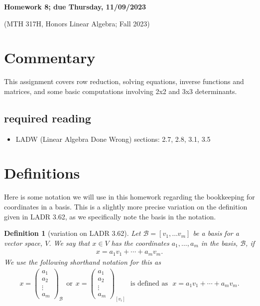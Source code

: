 \documentclass[12pt]{article}
\newtheorem{DEF}[thm]{Definition}
\def\B{\mathcal B}
\newcommand{\ColVecFour}[4]{\begin{pmatrix} #1\\ #2\\#3 \\ #4\end{pmatrix}}
\begin{document}
	\begin{LARGE}
	\begin{center}
		
		
		
	
	\textbf{Homework 8; due Thursday, 11/09/2023}
	

	(MTH 317H, Honors Linear Algebra;  Fall 2023)
	\end{center}
	\end{LARGE}
	\vspace{0.15in}
	
	



	
\section{Commentary}

This assignment covers row reduction, solving equations, inverse functions and matrices, and some basic computations involving 2x2 and 3x3 determinants.  

\subsection{required reading}

\begin{itemize}
	\item LADW (Linear Algebra Done Wrong)     sections: 2.7, 2.8, 3.1, 3.5  
\end{itemize}




\section{Definitions}\label{defs}
Here is some notation we will use in this homework regarding the bookkeeping for coordinates in a basis.  This is a slightly more precise variation on the definition given in LADR 3.62, as we specifically note the basis in the notation.

\begin{DEF}[variation on LADR 3.62]

Let $\B = [v_1, \dots v_m]$ be a basis for a vector space, $V$.  We say that $x\in V$ has the coordinates $a_1,\dots,a_m$ in the basis, $\B$, if 
\begin{align*}
	x = a_1 v_1 + \cdots + a_m v_m.
\end{align*}
We use the following shorthand notation for this as
\begin{align}\label{eq:Coordinates}
	x=\ColVecFour{a_1}{a_2}{\vdots}{a_m}_{\B}\ \ \text{or}\ \
	x=\ColVecFour{a_1}{a_2}{\vdots}{a_m}_{[v_i]} \ \ \ \text{is defined as}\ \ \
	x = a_1 v_1 + \cdots + a_m v_m.
\end{align}

\end{DEF}
\end{document}
